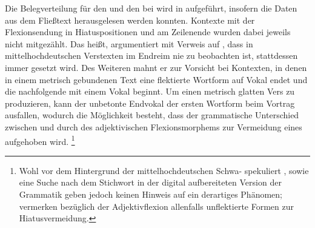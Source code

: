 Die Belegverteilung für den  und den  bei
\citet{askedal1973} wird in  aufgeführt, insofern die
Daten aus dem Fließtext herausgelesen werden konnten. Kontexte mit der
Flexionsendung in Hiatuspositionen und am Zeilenende wurden dabei
jeweils nicht mitgezählt. Das heißt, \citet[89--91]{askedal1973} argumentiert
mit Verweis auf \citet[662--663]{grimm1870}, dass in
mittelhochdeutschen Verstexten im Endreim nie 
zu beobachten ist, stattdessen immer  gesetzt wird. Des Weiteren mahnt
er zur Vorsicht bei Kontexten, in denen in einem metrisch gebundenen Text eine
flektierte Wortform auf Vokal endet und die nachfolgende mit einem Vokal
beginnt. Um einen metrisch glatten Vers zu produzieren, kann der unbetonte
Endvokal der ersten Wortform beim Vortrag ausfallen, wodurch die Möglichkeit
besteht, dass der grammatische Unterschied zwischen  und 
durch  des adjektivischen Flexionsmorphems zur
Vermeidung eines  aufgehoben wird.%
%
	\footnote{Wohl vor dem Hintergrund der
		mittelhochdeutschen Schwa-
		\autocites{lindgren1953}[109--111]{paul2007} spekuliert
		\citet[91]{askedal1973},  \citet[27, 109--111,
		203]{paul2007} sowie eine Suche nach dem Stichwort  in
		der digital aufbereiteten Version der Grammatik geben jedoch keinen
		Hinweis auf ein derartiges Phänomen; \citet[244]{ksw2} vermerken
		bezüglich der Adjektivflexion allenfalls
		unflektierte Formen zur Hiatusvermeidung.}
		
